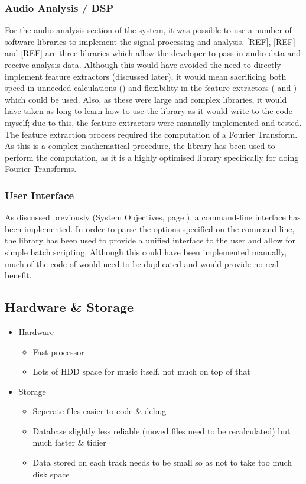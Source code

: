 \subsubsection{Audio Analysis / DSP}
For the audio analysis section of the system, it was possible to use a number of software libraries to implement the signal processing and analysis. [REF], [REF] and [REF] are three libraries which allow the developer to pass in audio data and receive analysis data. Although this would have avoided the need to directly implement feature extractors (discussed later), it would mean sacrificing both speed in unneeded calculations () and flexibility in the feature extractors ( and ) which could be used. Also, as these were large and complex libraries, it would have taken as long to learn how to use the library as it would write to the code myself; due to this, the feature extractors were manually implemented and tested.
The feature extraction process required the computation of a Fourier Transform. As this is a complex mathematical procedure, the   library has been used to perform the computation, as it is a highly optimised library specifically for doing Fourier Transforms.
\subsubsection{User Interface}
As discussed previously (System Objectives, page \pageref{text:spec:objective:cli}), a command-line interface has been implemented. In order to parse the options specified on the command-line, the  library has been used to provide a unified interface to the user and allow for simple batch scripting. Although this could have been implemented manually, much of the code of  would need to be duplicated and would provide no real benefit.
\subsection{Hardware \& Storage}
\begin{itemize}
	\item Hardware
	\begin{itemize}
		\item Fast processor
		\item Lots of HDD space for music itself, not much on top of that
	\end{itemize}
	\item Storage
	\begin{itemize}
		\item Seperate files easier to code \& debug
		\item Database slightly less reliable (moved files need to be recalculated) but much faster \& tidier
		\item Data stored on each track needs to be small so as not to take too much disk space
	\end{itemize}
\end{itemize}

